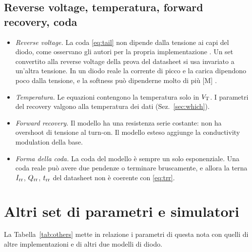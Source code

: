 \documentclass[10pt,a4paper]{scrartcl}
\let\newcommand\lmitdefine
\newcommand{\Irr}{I_\mathrm{rr}}
\newcommand{\Qrr}{Q_\mathrm{rr}}
\newcommand{\trr}{t_\mathrm{rr}}
\newcommand{\VT}{V_\mathrm{T}}
\begin{document}
\subsection{Reverse voltage, temperatura, forward recovery, coda}
\begin{itemize}
\item \emph{Reverse voltage.} La coda \eqref{eq:tail} non dipende dalla tensione ai capi del diodo, come osservano gli autori per la propria implementazione \cite{pemodels}. Un set convertito alla reverse voltage della prova del datasheet si usa invariato a un'altra tensione. In un diodo reale la corrente di picco e la carica dipendono poco dalla tensione, e la softness può dipenderne molto di più [M] \cite{lutz}.
\item \emph{Temperatura.} Le equazioni contengono la temperatura solo in $\VT$. I parametri del recovery valgono alla temperatura dei dati (Sez.~\ref{sec:which}).
\item \emph{Forward recovery.} Il modello ha una resistenza serie costante: non ha overshoot di tensione al turn-on. Il modello esteso \cite{ma1993} aggiunge la conductivity modulation della base.
\item \emph{Forma della coda.} La coda del modello è sempre un solo esponenziale. Una coda reale può avere due pendenze o terminare bruscamente, e allora la terna $\Irr$, $\Qrr$, $\trr$ del datasheet non è coerente con \eqref{eq:trr}.
\end{itemize}

\section{Altri set di parametri e simulatori}
\label{sec:others}
La Tabella~\ref{tab:others} mette in relazione i parametri di questa nota con quelli di altre implementazioni e di altri due modelli di diodo.
\end{document}
